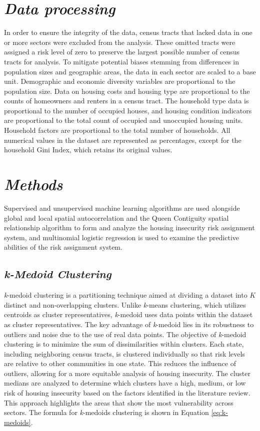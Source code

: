 \section{\textit{Data processing}}
In order to ensure the integrity of the data, census tracts that lacked data in one or more sectors were excluded from the analysis. These omitted tracts were assigned a risk level of zero to preserve the largest possible number of census tracts for analysis. To mitigate potential biases stemming from differences in population sizes and geographic areas, the data in each sector are scaled to a base unit. Demographic and economic diversity variables are proportional to the population size. Data on housing costs and housing type are proportional to the counts of homeowners and renters in a census tract. The household type data is proportional to the number of occupied houses, and housing condition indicators are proportional to the total count of occupied and unoccupied housing units. Household factors are proportional to the total number of households. All numerical values in the dataset are represented as percentages, except for the household Gini Index, which retains its original values. 

\section{\textit{Methods}}
Supervised and unsupervised machine learning algorithms are used alongside global and local spatial autocorrelation and the Queen Contiguity spatial relationship algorithm to form and analyze the housing insecurity risk assignment system, and multinomial logistic regression is used to examine the predictive abilities of the risk assignment system.





\subsection{\textit{\textit{k}-Medoid Clustering}}
\textit{k}-medoid clustering is a partitioning technique aimed at dividing a dataset into \(K\) distinct and non-overlapping clusters. Unlike \textit{k}-means clustering, which utilizes centroids as cluster representatives, \textit{k}-medoid uses data points within the dataset as cluster representatives. The key advantage of \textit{k}-medoid lies in its robustness to outliers and noise due to the use of real data points. The objective of \textit{k}-medoid clustering is to minimize the sum of dissimilarities within clusters. Each state, including neighboring census tracts, is clustered individually so that risk levels are relative to other communities in one state. This reduces the influence of outliers, allowing for a more equitable analysis of housing insecurity. The cluster medians are analyzed to determine which clusters have a high, medium, or low risk of housing insecurity based on the factors identified in the literature review. This approach highlights the areas that show the most vulnerability across sectors. The formula for \textit{k}-medoids clustering is shown in Equation \ref{eq:k-medoids}.

